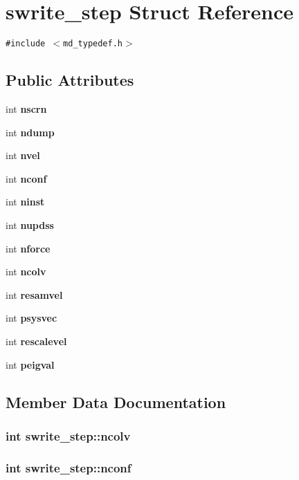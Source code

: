 \section{swrite\_\-step Struct Reference}
\label{structswrite__step}
{\tt \#include $<$md\_\-typedef.h$>$}

\subsection*{Public Attributes}
\begin{CompactItemize}
\item 
int {\bf nscrn}
\item 
int {\bf ndump}
\item 
int {\bf nvel}
\item 
int {\bf nconf}
\item 
int {\bf ninst}
\item 
int {\bf nupdss}
\item 
int {\bf nforce}
\item 
int {\bf ncolv}
\item 
int {\bf resamvel}
\item 
int {\bf psysvec}
\item 
int {\bf rescalevel}
\item 
int {\bf peigval}
\end{CompactItemize}


\subsection{Member Data Documentation}
\subsubsection{\setlength{\rightskip}{0pt plus 5cm}int {\bf swrite\_\-step::ncolv}}\label{structswrite__step_0e9e36bf3c69024e579ccd9f602cb001}


\subsubsection{\setlength{\rightskip}{0pt plus 5cm}int {\bf swrite\_\-step::nconf}}\label{structswrite__step_3bfa2043ab95719f470e82c64fdcca7d}


